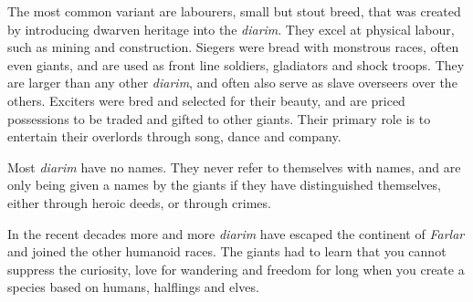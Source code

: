 The most common variant are labourers, small but stout breed, that was created
by introducing dwarven heritage into the \emph{diarim}. They excel at physical
labour, such as mining and construction. Siegers were bread with monstrous
races, often even giants, and are used as front line soldiers, gladiators and
shock troops. They are larger than any other \emph{diarim}, and often also
serve as slave overseers over the others. Exciters were bred and selected for
their beauty, and are priced possessions to be traded and gifted to other
giants. Their primary role is to entertain their overlords through song, dance
and company.

Most \emph{diarim} have no names. They never refer to themselves with names,
and are only being given a names by the giants if they have distinguished
themselves, either through heroic deeds, or through crimes.

In the recent decades more and more \emph{diarim} have escaped the continent
of \emph{Farlar} and joined the other humanoid races. The giants had to learn
that you cannot suppress the curiosity, love for wandering and freedom for long
when you create a species based on humans, halflings and elves.

